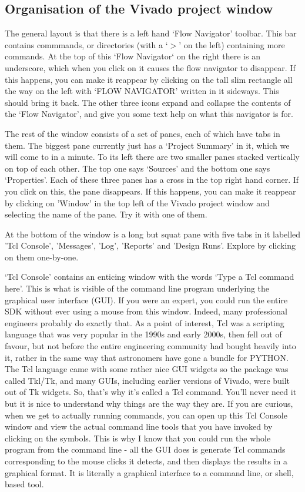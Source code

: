 \documentclass[../physical_computing.tex]{subfiles}
\begin{document}
\subsection{Organisation of the Vivado project window}
\label{sec:vivado_project_window}

The general layout is that there is a left hand `Flow Navigator' toolbar. This bar contains commmands, or directories (with a `$>$' on the left) containing more commands. At the top of this `Flow Navigator` on the right there is an underscore, which when you click on it causes the flow navigator to disappear. If this happens, you can make it reappear by clicking on the tall slim rectangle all the way on the left with `FLOW NAVIGATOR' written in it sideways. This should bring it back. The other three icons expand and collapse the contents of the `Flow Navigator', and give you some text help on what this navigator is for. 

The rest of the window consists of a set of panes, each of which have tabs in them. The biggest pane currently just has a `Project Summary' in it, which we will come to in a minute. To its left there are two smaller panes stacked vertically on top of each other. The top one says `Sources' and the bottom one says `Properties'. Each of these three panes has a cross in the top right hand corner. If you click on this, the pane disappears. If this happens, you can make it reappear by clicking on 'Window' in the top left of the Vivado project window and selecting the name of the pane. Try it with one of them.

At the bottom of the window is a long but squat pane with five tabs in it labelled 'Tcl Console', 'Messages', 'Log', 'Reports' and 'Design Runs'. Explore by clicking on them one-by-one. 

`Tcl Console' contains an enticing window with the words `Type a Tcl command here'. This is what is visible of the command line program underlying the graphical user interface (GUI). If you were an expert, you could run the entire SDK without ever using a mouse from this window. Indeed, many professional engineers probably do exactly that. As a point of interest, Tcl was a scripting language that was very popular in the 1990s and early 2000s, then fell out of favour, but not before the entire engineering community had bought heavily into it, rather in the same way that astronomers have gone a bundle for PYTHON. The Tcl language came with some rather nice GUI widgets so the package was called Tkl/Tk, and many GUIs, including earlier versions of Vivado, were built out of Tk widgets. So, that's why it's called a Tcl command. You'll never need it but it is nice to understand why things are the way they are. If you are curious, when we get to actually running commands, you can open up this Tcl Console window and view the actual command line tools that you have invoked by clicking on the symbols. This is why I know that you could run the whole program from the command line - all the GUI does is generate Tcl commands corresponding to the mouse clicks it detects, and then displays the results in a graphical format. It is literally a graphical interface to a command line, or shell, based tool.
\end{document}
